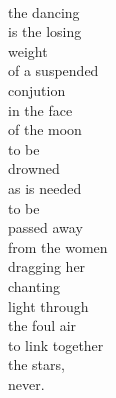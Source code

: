 \documentclass[smalldemyvopaper,11pt,twoside,onecolumn,openright,extrafontsizes]{memoir}
\begin{document}
\\the dancing
\\is the losing
\\weight
\\of a suspended
\\conjution
\\in the face
\\of the moon
\\to be
\\drowned
\\as is needed
\\to be
\\passed away
\\from the women
\\dragging her
\\chanting
\\light through
\\the foul air
\\to link together
\\the stars,
\\never.
\end{document}
